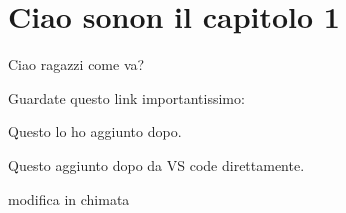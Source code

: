 \chapter{Ciao sonon il capitolo 1}

Ciao ragazzi come va?

Guardate questo link importantissimo: \cite{provaBibliografia}


Questo lo ho aggiunto dopo.

Questo aggiunto dopo da VS code direttamente.


modifica in chimata